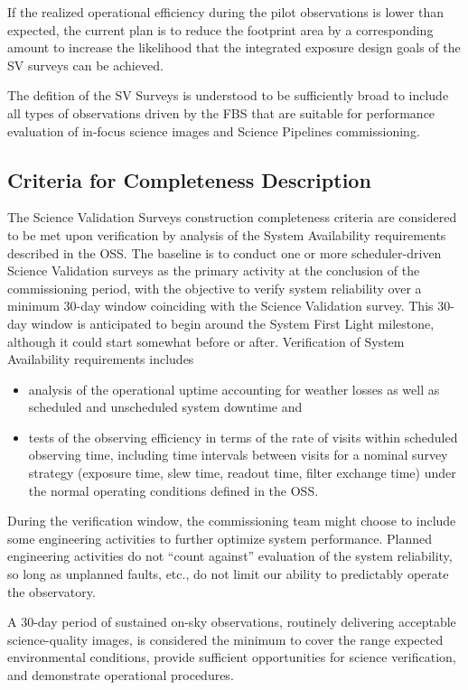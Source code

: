 If the realized operational efficiency during the pilot observations is lower than expected, the current plan is to reduce the footprint area by a corresponding amount to increase the likelihood that the integrated exposure design goals of the SV surveys can be achieved.

The defition of the SV Surveys is understood to be sufficiently broad to include all types of observations driven by the FBS that are suitable for performance evaluation of in-focus science images and Science Pipelines commissioning.

\subsection{Criteria for Completeness Description}

The Science Validation Surveys construction completeness criteria are considered to be met upon verification by analysis of the System Availability requirements described in the OSS.
The baseline is to conduct one or more scheduler-driven Science Validation surveys as the primary activity at the conclusion of the commissioning period, with the objective to verify system reliability over a minimum 30-day window coinciding with the Science Validation survey. This 30-day window is anticipated to begin around the System First Light milestone, although it could start somewhat before or after.
Verification of System Availability requirements includes

\begin{itemize}
        \item analysis of the operational uptime accounting for weather losses as well as scheduled and unscheduled system downtime and
        \item tests of the observing efficiency in terms of the rate of visits within scheduled observing time, including time intervals between visits for a nominal survey strategy (exposure time, slew time, readout time, filter exchange time) under the normal operating conditions defined in the OSS.
\end{itemize}

During the verification window, the commissioning team might choose to include some engineering activities to further optimize system performance. Planned engineering activities do not ``count against'' evaluation of the system reliability, so long as unplanned faults, etc., do not limit our ability to predictably operate the observatory.

A 30-day period of sustained on-sky observations, routinely delivering acceptable science-quality images, is considered the minimum to cover the range expected environmental conditions, provide sufficient opportunities for science verification, and demonstrate operational procedures.

